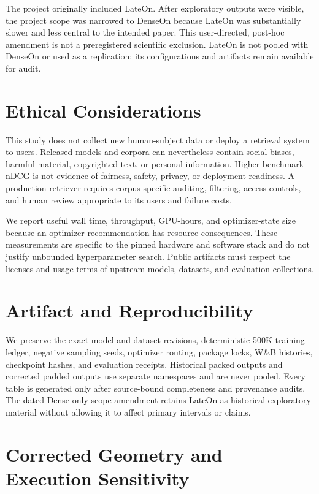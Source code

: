 \documentclass[11pt]{article}
\begin{document}
The project originally included LateOn. After exploratory outputs were visible, the project scope
was narrowed to DenseOn because LateOn was substantially slower and less central to the intended
paper. This user-directed, post-hoc amendment is not a preregistered scientific exclusion. LateOn is
not pooled with DenseOn or used as a replication; its configurations and artifacts remain available
for audit.

\section{Ethical Considerations}

This study does not collect new human-subject data or deploy a retrieval system to users. Released
models and corpora can nevertheless contain social biases, harmful material, copyrighted text, or
personal information. Higher benchmark nDCG is not evidence of fairness, safety, privacy, or
deployment readiness. A production retriever requires corpus-specific auditing, filtering, access
controls, and human review appropriate to its users and failure costs.

We report useful wall time, throughput, GPU-hours, and optimizer-state size because an optimizer
recommendation has resource consequences. These measurements are specific to the pinned hardware
and software stack and do not justify unbounded hyperparameter search. Public artifacts must respect
the licenses and usage terms of upstream models, datasets, and evaluation collections.



\appendix

\section{Artifact and Reproducibility}

We preserve the exact model and dataset revisions, deterministic 500K training ledger, negative
sampling seeds, optimizer routing, package locks, W\&B histories, checkpoint hashes, and evaluation
receipts. Historical packed outputs and corrected padded outputs use separate namespaces and are
never pooled. Every table is generated only after source-bound completeness and provenance audits.
The dated Dense-only scope amendment retains LateOn as historical exploratory material without
allowing it to affect primary intervals or claims.

\section{Corrected Geometry and Execution Sensitivity}
\end{document}
